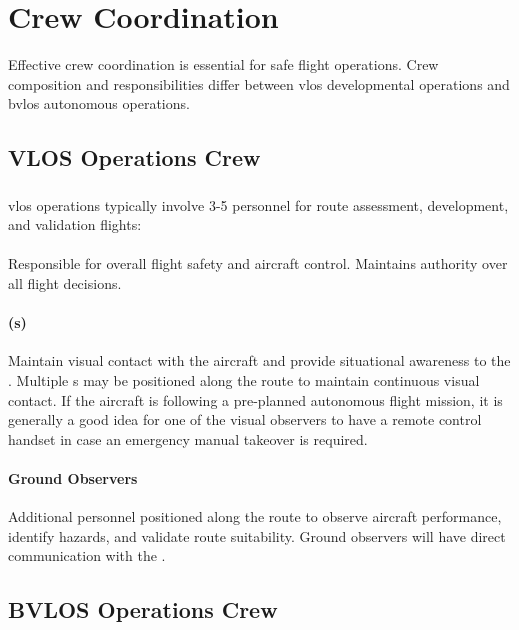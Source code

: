 \section{Crew Coordination}\label{sec:crewcoordination}

Effective crew coordination is essential for safe flight operations. Crew composition and responsibilities differ between \ac{vlos} developmental operations and \ac{bvlos} autonomous operations.

    \subsection{VLOS Operations Crew}\label{ssec:vloscrew}

        \subsubsection{} \ac{vlos} operations typically involve 3-5 personnel for route assessment, development, and validation flights:

            \paragraph{} Responsible for overall flight safety and aircraft control. Maintains authority over all flight decisions.

            \paragraph{(s)} Maintain visual contact with the aircraft and provide situational awareness to the . Multiple s may be positioned along the route to maintain continuous visual contact. If the aircraft is following a pre-planned autonomous flight mission, it is generally a good idea for one of the visual observers to have a remote control handset in case an emergency manual takeover is required.

            \paragraph{Ground Observers} Additional personnel positioned along the route to observe aircraft performance, identify hazards, and validate route suitability. Ground observers will have direct communication with the .

    \subsection{BVLOS Operations Crew}\label{ssec:bvloscrew}

